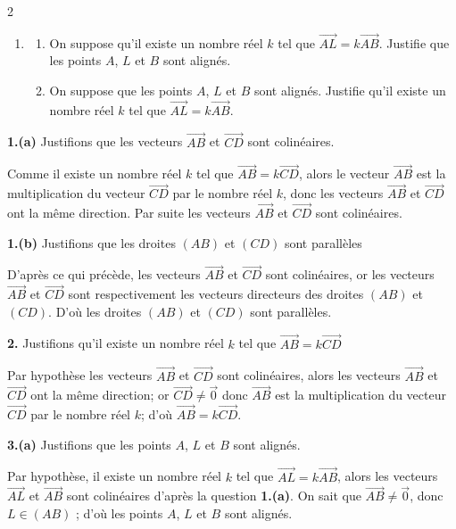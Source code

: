 \begin{multicols*}{2}
\begin{enumerate}
  		Justifie qu'il existe un nombre réel $k$ tel que $\overrightarrow{AB}=k\overrightarrow{CD}$.
  		\item 
  		\begin{enumerate}
  			\item On suppose qu'il existe un nombre réel $k$ tel que $\overrightarrow{AL}=k\overrightarrow{AB}$. Justifie que les points $A$, $L$ et $B$ sont alignés.
  			\item  On suppose que les points $A$, $L$ et $B$ sont alignés. Justifie qu'il existe un nombre réel $k$ tel que $\overrightarrow{AL}=k\overrightarrow{AB}$.
  		\end{enumerate}
  	\end{enumerate}
  	\dure
  	\resul
  	\textbf{1.(a)} Justifions que les vecteurs $\overrightarrow{AB}$ et $\overrightarrow{CD}$ sont colinéaires.
  	
  	Comme il existe un nombre réel $k$ tel que $\overrightarrow{AB}=k\overrightarrow{CD}$, alors le vecteur $\overrightarrow{AB}$ est la multiplication du vecteur $\overrightarrow{CD}$ par le nombre réel $k$, donc les vecteurs  $\overrightarrow{AB}$ et $\overrightarrow{CD}$ ont la même direction. Par suite les vecteurs $\overrightarrow{AB}$ et $\overrightarrow{CD}$ sont colinéaires.  
  	
  	\textbf{1.(b)} Justifions que les droites $(AB)$ et $(CD)$ sont parallèles
  	
  	
  	D'après ce qui précède, les vecteurs $\overrightarrow{AB}$ et $\overrightarrow{CD}$ sont colinéaires, or les vecteurs $\overrightarrow{AB}$ et $\overrightarrow{CD}$ sont respectivement les vecteurs directeurs des droites $(AB)$ et $(CD)$. D'où les droites $(AB)$ et $(CD)$ sont parallèles.
  	
  	\textbf{2.} Justifions qu'il existe un nombre réel $k$ tel que $\overrightarrow{AB}=k\overrightarrow{CD}$
  	
  	Par hypothèse les vecteurs $\overrightarrow{AB}$ et $\overrightarrow{CD}$ sont colinéaires, alors les vecteurs $\overrightarrow{AB}$ et $\overrightarrow{CD}$ ont la même direction; or $\overrightarrow{CD}\neq \overrightarrow{0}$ donc $\overrightarrow{AB}$ est la multiplication du vecteur $\overrightarrow{CD}$  par le nombre réel $k$; d'où  $\overrightarrow{AB}=k\overrightarrow{CD}$.
  	
  	\textbf{3.(a)} Justifions que les points $A$, $L$ et $B$ sont alignés. 
  	
  	Par hypothèse, il existe un nombre réel $k$ tel que $\overrightarrow{AL}=k\overrightarrow{AB}$, alors les vecteurs $\overrightarrow{AL}$ et $\overrightarrow{AB}$ sont colinéaires d'après la question \textbf{1.(a)}. On sait que $\overrightarrow{AB}\neq \overrightarrow{0}$, donc $L\in(AB)$ ; d'où les points $A$, $L$ et $B$ sont alignés.
  	

\end{multicols*}
